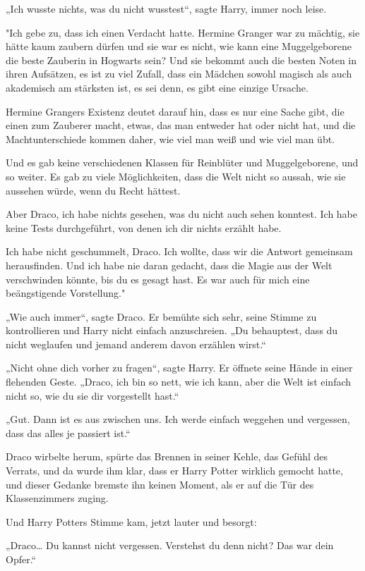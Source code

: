 {„Ich wusste nichts, was du nicht wusstest“, sagte Harry, immer noch leise.

"Ich gebe zu, dass ich einen Verdacht hatte. Hermine Granger war zu mächtig, sie hätte kaum zaubern dürfen und sie war es nicht, wie kann eine Muggelgeborene die beste Zauberin in Hogwarts sein? Und sie bekommt auch die besten Noten in ihren Aufsätzen, es ist zu viel Zufall, dass ein Mädchen sowohl magisch als auch akademisch am stärksten ist, es sei denn, es gibt eine einzige Ursache.

Hermine Grangers Existenz deutet darauf hin, dass es nur eine Sache gibt, die einen zum Zauberer macht, etwas, das man entweder hat oder nicht hat, und die Machtunterschiede kommen daher, wie viel man weiß und wie viel man übt.

Und es gab keine verschiedenen Klassen für Reinblüter und Muggelgeborene, und so weiter. Es gab zu viele Möglichkeiten, dass die Welt nicht so aussah, wie sie aussehen würde, wenn du Recht hättest.

Aber Draco, ich habe nichts gesehen, was du nicht auch sehen konntest. Ich habe keine Tests durchgeführt, von denen ich dir nichts erzählt habe.

Ich habe nicht geschummelt, Draco. Ich wollte, dass wir die Antwort gemeinsam herausfinden. Und ich habe nie daran gedacht, dass die Magie aus der Welt verschwinden könnte, bis du es gesagt hast. Es war auch für mich eine beängstigende Vorstellung."

„Wie auch immer“, sagte Draco. Er bemühte sich sehr, seine Stimme zu kontrollieren und Harry nicht einfach anzuschreien. „Du behauptest, dass du nicht weglaufen und jemand anderem davon erzählen wirst.“

„Nicht ohne dich vorher zu fragen“, sagte Harry. Er öffnete seine Hände in einer flehenden Geste. „Draco, ich bin so nett, wie ich kann, aber die Welt ist einfach nicht so, wie du sie dir vorgestellt hast.“

„Gut. Dann ist es aus zwischen uns. Ich werde einfach weggehen und vergessen, dass das alles je passiert ist.“

Draco wirbelte herum, spürte das Brennen in seiner Kehle, das Gefühl des Verrats, und da wurde ihm klar, dass er Harry Potter wirklich gemocht hatte, und dieser Gedanke bremste ihn keinen Moment, als er auf die Tür des Klassenzimmers zuging.

Und Harry Potters Stimme kam, jetzt lauter und besorgt:

„Draco… Du kannst nicht vergessen. Verstehst du denn nicht? Das war dein Opfer.“

}
